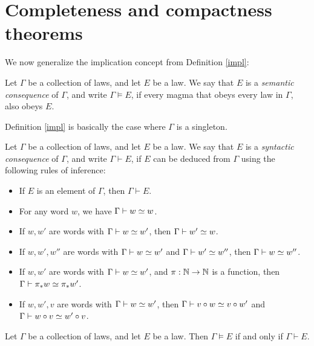 \chapter{Completeness and compactness theorems}

We now generalize the implication concept from Definition \ref{impl}:

\begin{definition}\label{semantic-def} Let $\Gamma$ be a collection of laws, and let $E$ be a law. We say that $E$ is a \emph{semantic consequence} of $\Gamma$, and write $\Gamma \models E$, if every magma that obeys every law in $\Gamma$, also obeys $E$.
\end{definition}

Definition \ref{impl} is basically the case where $\Gamma$ is a singleton.

\begin{definition}\label{syntactic-def} Let $\Gamma$ be a collection of laws, and let $E$ be a law. We say that $E$ is a \emph{syntactic consequence} of $\Gamma$, and write $\Gamma \vdash E$, if $E$ can be deduced from $\Gamma$ using the following rules of inference:
\begin{itemize}
\item If $E$ is an element of $\Gamma$, then $\Gamma \vdash E$.
\item For any word $w$, we have $\Gamma \vdash w \simeq w$.
\item If $w,w'$ are words with $\Gamma \vdash w \simeq w'$, then $\Gamma \vdash w' \simeq w$.
\item If $w,w',w''$ are words with $\Gamma \vdash w \simeq w'$ and $\Gamma \vdash w' \simeq w''$, then $\Gamma \vdash w \simeq w''$.
\item If $w,w'$ are words with $\Gamma \vdash w \simeq w'$, and $\pi : \mathbb{N} \to \mathbb{N}$ is a function, then $\Gamma \vdash \pi_* w \simeq \pi_* w'$.
\item If $w,w',v$ are words with $\Gamma \vdash w \simeq w'$, then $\Gamma \vdash v \circ w \simeq v \circ w'$ and $\Gamma \vdash w \circ v \simeq w' \circ v$.
\end{itemize}
\end{definition}

\begin{theorem}\label{completeness-thm}  Let $\Gamma$ be a collection of laws, and let $E$ be a law.  Then $\Gamma \models E$ if and only if $\Gamma \vdash E$.
\end{theorem}

